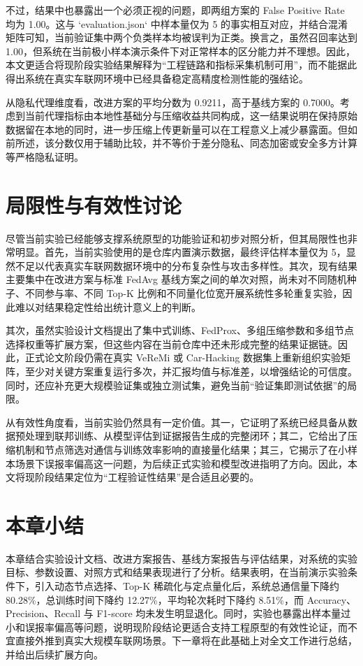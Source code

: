 不过，结果中也暴露出一个必须正视的问题，即两组方案的 False Positive Rate 均为 1.00。这与 `evaluation.json` 中样本量仅为 5 的事实相互对应，并结合混淆矩阵可知，当前验证集中两个负类样本均被误判为正类。换言之，虽然召回率达到 1.00，但系统在当前极小样本演示条件下对正常样本的区分能力并不理想。因此，本文更适合将现阶段实验结果解释为“工程链路和指标采集机制可用”，而不能据此得出系统在真实车联网环境中已经具备稳定高精度检测性能的强结论。

从隐私代理维度看，改进方案的平均分数为 0.9211，高于基线方案的 0.7000。考虑到当前代理指标由本地性基础分与压缩收益共同构成，这一结果说明在保持原始数据留在本地的同时，进一步压缩上传更新量可以在工程意义上减少暴露面。但如前所述，该分数仅用于辅助比较，并不等价于差分隐私、同态加密或安全多方计算等严格隐私证明。

\section{局限性与有效性讨论}
\label{sec:experiment-limitations}

尽管当前实验已经能够支撑系统原型的功能验证和初步对照分析，但其局限性也非常明显。首先，当前实验使用的是仓库内置演示数据，最终评估样本量仅为 5，显然不足以代表真实车联网数据环境中的分布复杂性与攻击多样性。其次，现有结果主要集中在改进方案与标准 FedAvg 基线方案之间的单次对照，尚未对不同随机种子、不同参与率、不同 Top-K 比例和不同量化位宽开展系统性多轮重复实验，因此难以对结果稳定性给出统计意义上的判断。

其次，虽然实验设计文档提出了集中式训练、FedProx、多组压缩参数和多组节点选择权重等扩展方案，但这些内容在当前仓库中还未形成完整的结果证据链。因此，正式论文阶段仍需在真实 VeReMi 或 Car-Hacking 数据集上重新组织实验矩阵，至少对关键方案重复运行多次，并汇报均值与标准差，以增强结论的可信度。同时，还应补充更大规模验证集或独立测试集，避免当前“验证集即测试依据”的局限。

从有效性角度看，当前实验仍然具有一定价值。其一，它证明了系统已经具备从数据预处理到联邦训练、从模型评估到证据报告生成的完整闭环；其二，它给出了压缩机制和节点筛选对通信与训练效率影响的直接量化结果；其三，它揭示了在小样本场景下误报率偏高这一问题，为后续正式实验和模型改进指明了方向。因此，本文将现阶段结果定位为“工程验证性结果”是合适且必要的。

\section{本章小结}
\label{sec:experiment-summary}

本章结合实验设计文档、改进方案报告、基线方案报告与评估结果，对系统的实验目标、参数设置、对照方式和结果表现进行了分析。结果表明，在当前演示实验条件下，引入动态节点选择、Top-K 稀疏化与定点量化后，系统总通信量下降约 80.28\%，总训练时间下降约 12.27\%，平均轮次耗时下降约 8.51\%，而 Accuracy、Precision、Recall 与 F1-score 均未发生明显退化。同时，实验也暴露出样本量过小和误报率偏高等问题，说明现阶段结论更适合支持工程原型的有效性论证，而不宜直接外推到真实大规模车联网场景。下一章将在此基础上对全文工作进行总结，并给出后续扩展方向。
